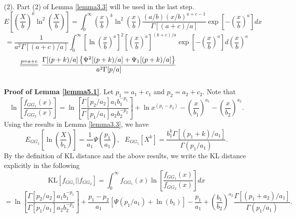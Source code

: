 \documentclass{ps}
\theoremstyle{plain}%
\theoremstyle{definition}
\theoremstyle{remark}
\newcommand{\longeq}{\scalebox{4}[1]{=}}   %
\begin{document}
(2). Part (2) of Lemma \ref{lemma3.3} will be used in the last step.
$$
E\left[\left(\frac{X}{b} \right)^k\ln^2\left(\frac{X}{b}\right) \right] = \int_0^\infty \left( \frac{x}{b}\right)^k\ln^2\left( \frac{x}{b}\right)\frac{(a/b)(x/b)^{a+c-1}}{\Gamma[(a+c)/a]}\exp\left[ -\left( \frac{x}{b}\right)^a\right]dx
$$ 
$$
=\frac{1}{a^2\Gamma[(a+c)/a]}\int_0^\infty \left[\ln\left( \frac{x}{b}\right)^a\right]^2 \left[\left(\frac{x}{b}\right)^a\right]^{(k+c)/a}\exp\left[-\left( \frac{x}{b}\right)^a\right] d\left(\frac{x}{b}\right)^a
$$
$$
\stackrel{p = a + c}{\longeq}\frac{\Gamma[(p+k)/a]\left\{ \Psi^2[(p+k)/a]+\Psi_1[(p+k)/a] \right\}  }{a^2\Gamma[p/a]} \hspace{30mm}
$$ \\
{\bf Proof of Lemma \ref{lemma5.1}}. Let $p_1 = a_1 + c_1$ and $p_2 = a_2 + c_2$.  Note that
$$
\ln\left[ \frac{f_{{GG}_1}(x)}{f_{{GG}_2}(x)}\right] = \ln\left[\frac{\Gamma[p_2/a_2]a_1b_1^{-p_1}}{\Gamma[p_1/a_1]a_2b_2^{-p_2}}\right]+\ln x^{(p_1-p_2)}-\left(\frac{x}{b_1}\right)^{a_1} -\left(\frac{x}{b_2}\right)^{a_2}.
$$
Using the results in Lemma \ref{lemma3.3}, we have
$$
E_{{GG}_1}\left[\ln\left(\frac{X}{b_1} \right)\right] = \frac{1}{a_1}\Psi\left( \frac{p_1}{a_1}\right), \ \ \ E_{{GG}_1}\left[ X^k\right] = \frac{b_1^k\Gamma[(p_1+k)/a_1]}{\Gamma(p_1/a_1)}.
$$
By the definition of KL distance and the above results, we write the KL distance explicitly in the following
$$
\mbox{KL}\left[f_{{GG}_1}||f_{{GG}_2} \right] = \int_0^\infty f_{{GG}_1}(x) \ln\left[ \frac{f_{{GG}_1}(x)}{f_{{GG}_2}(x)} \right]dx
$$
$$
=\ln\left[\frac{\Gamma[p_2/a_2]a_1b_1^{-p_1}}{\Gamma[p_1/a_1]a_2b_2^{-p_2}}\right]+\frac{p_1-p_2}{a_1}\left[ \Psi(p_1/a_1) + \ln (b_1)\right]-\frac{p_1}{a_1}+\left( \frac{b_1}{b_2}\right)^{a_2}\frac{\Gamma[(p_1+a_2)/a_1]}{\Gamma(p_1/a_1)}.
$$
\end{document}
